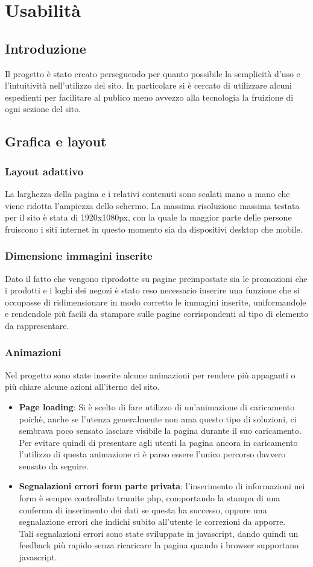 \documentclass[a4paper,12pt]{article}
\begin{document}
\section{Usabilità}
\subsection{Introduzione}
Il progetto è stato creato perseguendo per quanto possibile la semplicità d'uso e l'intuitività nell'utilizzo del sito. In particolare si è cercato di utilizzare alcuni espedienti per facilitare al publico meno avvezzo alla tecnologia la fruizione di ogni sezione del sito.
\subsection{Grafica e layout}
\subsubsection{Layout adattivo}
La larghezza della pagina e i relativi contenuti sono scalati mano a mano che viene ridotta l'ampiezza dello schermo. La massima risoluzione massima testata per il sito è stata di 1920x1080px, con la quale la maggior parte delle persone fruiscono i siti internet in questo momento sia da dispositivi desktop che mobile.
\subsubsection{Dimensione immagini inserite}
Dato il fatto che vengono riprodotte su pagine preimpostate sia le promozioni che i prodotti e i loghi dei negozi è stato reso necessario inserire una funzione che si occupasse di ridimensionare in modo corretto le immagini inserite, uniformandole e rendendole più facili da stampare sulle pagine corrispondenti al tipo di elemento da rappresentare.

\subsubsection{Animazioni}
Nel progetto sono state inserite alcune animazioni per rendere più appaganti o più chiare alcune azioni all'iterno del sito.
\begin{itemize}
	\item \textbf{Page loading}: Si è scelto di fare utilizzo di un'animazione di caricamento poichè, anche se l'utenza generalmente non ama questo tipo di soluzioni, ci sembrava poco sensato lasciare visibile la pagina durante il suo caricamento. Per evitare quindi di presentare agli utenti la pagina ancora in caricamento l'utilizzo di questa animazione ci è parso essere l'unico percorso davvero sensato da seguire.
	\newpage
	\item \textbf{Segnalazioni errori form parte privata}: l'inserimento di informazioni nei form è sempre controllato tramite php, comportando la stampa di una conferma di inserimento dei dati se questa ha successo, oppure una segnalazione errori che indichi subito all'utente le correzioni da apporre.\\
	Tali segnalazioni errori sono state sviluppate in javascript, dando quindi un feedback più rapido senza ricaricare la pagina quando i browser supportano javascript.
\end{itemize}
\end{document}
